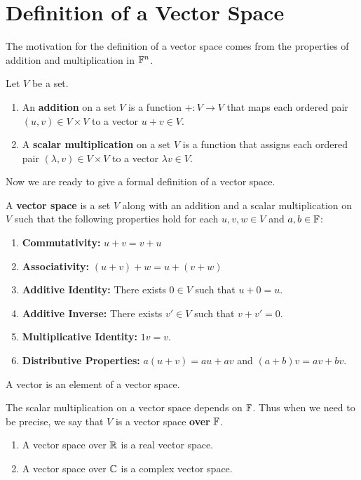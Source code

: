 \section{Definition of a Vector Space}
The motivation for the definition of a vector space comes from the properties of addition and multiplication in $\mathbb F^n$.
\begin{definition}
    Let $V$ be a set.
    \begin{enumerate}
        \item An \textbf{addition} on a set $V$ is a function $+: V\to V$ that maps each ordered pair $(u,v)\in V\times V$ to a vector $u+v\in V$.
        \item A \textbf{scalar multiplication} on a set $V$ is a function that assigns each ordered pair $(\lambda, v)\in V\times V$ to a vector $\lambda v \in V$.
    \end{enumerate}
\end{definition}
Now we are ready to give a formal definition of a vector space.
\newpage
\begin{definition}
    A \textbf{vector space} is a set $V$ along with an addition and a scalar multiplication on $V$ such that the following properties hold for each $u,v,w\in V$ and $a,b\in \mathbb F$: 
    \begin{enumerate}
        \item \textbf{Commutativity:} $u+v=v+u$
        \item \textbf{Associativity:} $(u+v)+w = u+(v+w)$
        \item \textbf{Additive Identity:} There exists $0\in V$ such that $u+0 = u$.
        \item \textbf{Additive Inverse:} There exists $v'\in V$ such that $v + v' = 0$.
        \item \textbf{Multiplicative Identity:} $1v = v$.
        \item \textbf{Distributive Properties:} $a(u+v) = au+av$ and $(a+b)v = av + bv$.
    \end{enumerate}
\end{definition}
\begin{definition}[Vector]
    A vector is an element of a vector space.
\end{definition}
The scalar multiplication on a vector space depends on $\mathbb F$. Thus when we need to be precise, we say that $V$ is a vector space \textbf{over} $\mathbb F$.
\begin{definition}
    \begin{enumerate}
        \item A vector space over $\mathbb{R}$ is a real vector space.
        \item A vector space over $\mathbb{C}$ is a complex vector space.
    \end{enumerate}
\end{definition}
